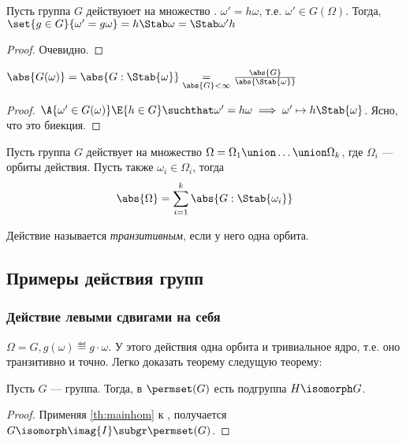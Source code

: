 \begin{theorem}
  Пусть группа $G$ действуюет на множество \Omega. $\omega'=h\omega$, т.\:е. $\omega'\in G(\Omega)$. Тогда, $\set{g\in G}{\omega'=g\omega}=h\Stab\omega=\Stab\omega' h$
\end{theorem}
\begin{proof}
  Очевидно.
\end{proof}

\begin{theorem}
  $\abs{G(\omega)}=\abs{G:\Stab{\omega}}\underset{\abs{G}<\infty}{=}\frac{\abs{G}}{\abs{\Stab{\omega}}}$
\end{theorem}
\begin{proof}
  $\A{\omega'\in G(\omega)}\E{h\in G}\suchthat \omega'=h\omega\implies \omega'\mapsto h\Stab{\omega}$. Ясно, что это биекция.
\end{proof}

\begin{corollary}
  Пусть группа $G$ действует на множество $\Omega=\Omega_1\union\dots\union\Omega_k$, где $\Omega_i$ --- орбиты действия. Пусть также $\omega_i\in \Omega_i$, тогда
  \[\abs{\Omega}=\sum_{i=1}^k{\abs{G:\Stab{\omega_i}}}\]
\end{corollary}

\begin{definition}
  Действие называется \emph{транзитивным}, если у него одна орбита.
\end{definition}

\subsection{Примеры действия групп}
\subsubsection{Действие левыми сдвигами на себя}
$\Omega=G, g(\omega)\eqdef g\cdot\omega$. У этого действия одна орбита и тривиальное ядро, т.\:е. оно транзитивно и точно. Легко доказать теорему следущую теорему:
\begin{theorem}\label{th:cayley}
  Пусть $G$ --- группа. Тогда, в $\permset(G)$ есть подгруппа $H\isomorph G$.
\end{theorem}
\begin{proof}
  Применяя \ref{th:mainhom} к , получается $G\isomorph \imag{I}\subgr \permset(G)$.
\end{proof}

